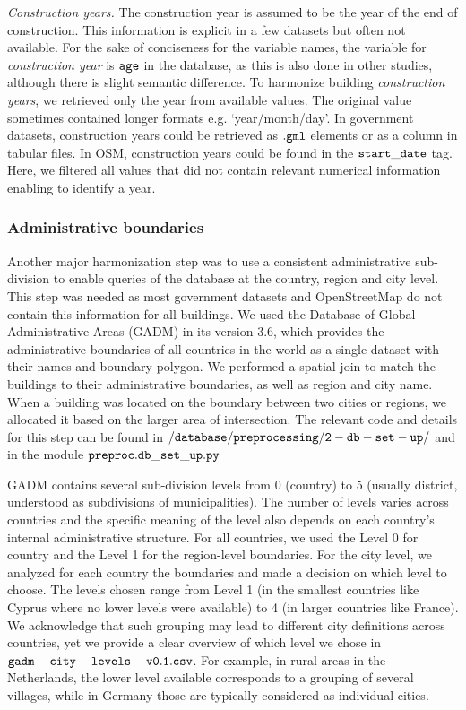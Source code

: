 \documentclass[fleqn,10pt]{wlscirep}
\begin{document}
\medskip \noindent \textit{Construction years.} \hspace{0.1cm} The construction year is assumed to be the year of the end of construction. This information is explicit in a few datasets but often not available. For the sake of conciseness for the variable names, the variable for \textit{construction year} is $\tt{age}$ in the database, as this is also done in other studies\cite{rosser2019predicting}, although there is slight semantic difference. To harmonize building \textit{construction years}, we retrieved only the year from available values. The original value sometimes contained longer formats e.g. `year/month/day'. In government datasets, construction years could be retrieved as $\tt{.gml}$ elements or as a column in tabular files. In OSM, construction years could be found in the $\tt{start\_date}$ tag. Here, we filtered all values that did not contain relevant numerical information enabling to identify a year.

\subsubsection*{Administrative boundaries}

Another major harmonization step was to use a consistent administrative sub-division to enable queries of the database at the country, region and city level. This step was needed as most government datasets and OpenStreetMap do not contain this information for all buildings. We used the Database of Global Administrative Areas (GADM) in its version 3.6, which provides the administrative boundaries of all countries in the world as a single dataset with their names and boundary polygon. We performed a spatial join to match the buildings to their administrative boundaries, as well as region and city name. When a building was located on the boundary between two cities or regions, we allocated it based on the larger area of intersection. The relevant code and details for this step can be found in $\tt{/database/preprocessing/2-db-set-up/}$ and in the module $\tt{preproc.db\_set\_up.py}$ \cite{eubucco-0.1-code2022}

GADM contains several sub-division levels from 0 (country) to 5 (usually district, understood as subdivisions of municipalities). The number of levels varies across countries and the specific meaning of the level also depends on each country's internal administrative structure. For all countries, we used the Level 0 for country and the Level 1 for the region-level boundaries. For the city level, we analyzed for each country the boundaries and made a decision on which level to choose. The levels chosen range from Level 1 (in the smallest countries like Cyprus where no lower levels were available) to 4 (in larger countries like France). We acknowledge that such grouping may lead to different city definitions across countries, yet we provide a clear overview of which level we chose in ${\tt gadm-city-levels-v0.1.csv}$. For example, in rural areas in the Netherlands, the lower level available corresponds to a grouping of several villages, while in Germany those are typically considered as individual cities. 
\end{document}
